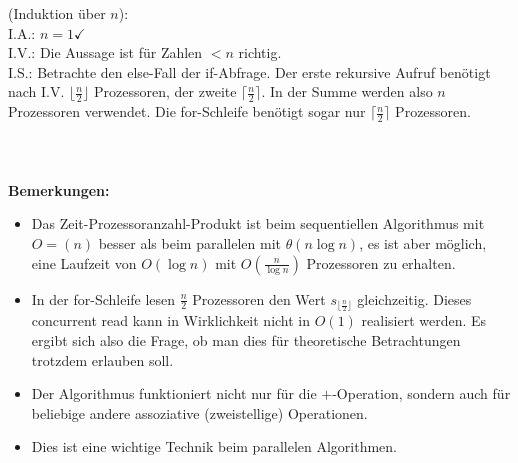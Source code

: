 (Induktion über $n$):\\
I.A.: $n = 1 \checkmark$
\\I.V.: Die Aussage ist für Zahlen $< n$ richtig.
\\I.S.: Betrachte den else-Fall der if-Abfrage. Der erste rekursive Aufruf be\-n\"{o}\-tigt nach I.V. 
$\lfloor\frac{n}{2}\rfloor$ Prozessoren, der zweite $\lceil\frac{n}{2}\rceil$. In der Summe werden
also $n$ Prozessoren verwendet. Die for-Schleife ben\"{o}tigt sogar nur $\lceil\frac{n}{2}\rceil$
Prozessoren. 
\\
\\
\\\\{\bf{Bemerkungen:}}
\begin{itemize}
 \item Das Zeit-Prozessoranzahl-Produkt ist beim sequentiellen Algorithmus mit $O=(n)$ besser als 
beim parallelen mit $\theta(n\log n)$, es ist aber möglich, eine Laufzeit von $O(\log n)$ mit 
$O(\frac{n}{\log n})$ Prozessoren zu erhalten.
 \item In der for-Schleife lesen $\frac{n}{2}$ Prozessoren den Wert $s_{\lfloor\frac{n}{2}\rfloor}$
gleichzeitig. Dieses concurrent read kann in Wirklichkeit nicht in $O(1)$ realisiert werden.
Es ergibt sich also die Frage, ob man dies f\"{u}r theoretische Betrachtungen trotzdem erlauben soll.
 \item Der Algorithmus funktioniert nicht nur für die $+$-Operation, sondern auch für beliebige andere assoziative (zweistellige) Operationen.
 \item Dies ist eine wichtige Technik beim parallelen Algorithmen.
\end{itemize}

